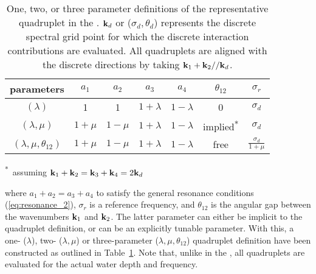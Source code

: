 \begin{table}
\caption{One, two, or three parameter definitions of the representative
         quadruplet in the \gmd. $\mbox{\bf k}_d$ or ($\sigma_d, \theta_d$) represents
         the discrete spectral grid point for which the discrete interaction
         contributions are evaluated. All quadruplets are aligned with the
         discrete directions by taking $\mbox{\bf k}_1 + \mbox{\bf k}_2 // \mbox{\bf k}_d$.}
  \label{tab:gmd_quad_def}
\vspace{\baselineskip}
\begin{center}
\begin{tabular}{ccccccc} \hline
 parameters  & $a_1$ & $a_2$ & $a_3$  & $a_4$ & $\theta_{12}$ &
 $\sigma_r$  \\ \hline
$(\lambda)$
    &    1    &    1    & $1+\lambda$  & $1-\lambda$ &    0  & $\sigma_d$ \\
$(\lambda, \mu)$
    & $1+\mu$ & $1-\mu$ & $1+\lambda$ & $1-\lambda$  &
                                   implied\textsuperscript{*}& $\sigma_d$ \\
$(\lambda, \mu, \theta_{12})$
    & $1+\mu$ & $1-\mu$ & $1+\lambda$ & $1-\lambda$  & free  &
                                                 $\frac{\sigma_d}{1+\mu}$ \\
\hline
\end{tabular}
\end{center}
\hspace{55mm} \textsuperscript{*}~assuming $\mbox{\bf k}_1 + \mbox{\bf k}_2 = \mbox{\bf k}_3 + \mbox{\bf k}_4 =
2\mbox{\bf k}_d$ 
\vspace{\baselineskip}
\botline
\end{table}

\noindent 
where $a_1 + a_2 = a_3 + a_4$ to satisfy the general resonance conditions
(\ref{eq:resonance_2}), $\sigma_r$ is a reference frequency, and $\theta_{12}$
is the angular gap between the wavenumbers $\mbox{\bf k}_1$ and $\mbox{\bf k}_2$. The latter
parameter can either be implicit to the quadruplet definition, or can be an
explicitly tunable parameter. With this, a one- ($\lambda$), two- ($\lambda,
\mu$) or three-parameter ($\lambda, \mu, \theta_{12}$) quadruplet definition
have been constructed as outlined in Table~\ref{tab:gmd_quad_def}. Note that,
unlike in the \dia, all quadruplets are evaluated for the actual water depth
and frequency.


